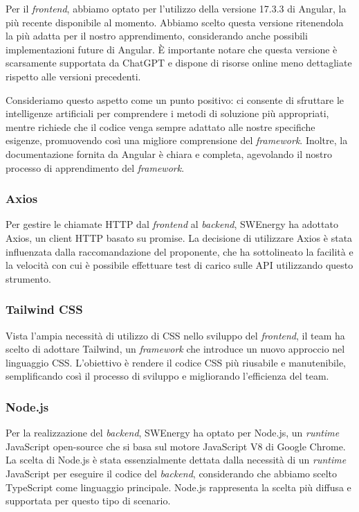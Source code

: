 Per il \textit{frontend}, abbiamo optato per l'utilizzo della versione 17.3.3 di
Angular, la più recente disponibile al momento. Abbiamo scelto questa versione
ritenendola la più adatta per il nostro apprendimento, considerando anche
possibili implementazioni future di Angular. È importante notare che questa
versione è scarsamente supportata da ChatGPT e dispone di risorse online meno
dettagliate rispetto alle versioni precedenti.

Consideriamo questo aspetto come un punto positivo: ci consente di sfruttare le
intelligenze artificiali per comprendere i metodi di soluzione più appropriati,
mentre richiede che il codice venga sempre adattato alle nostre specifiche
esigenze, promuovendo così una migliore comprensione del \textit{framework}.
Inoltre, la documentazione fornita da Angular è chiara e completa, agevolando il
nostro processo di apprendimento del \textit{framework}.

\subsubsection{Axios}

Per gestire le chiamate HTTP dal \textit{frontend} al \textit{backend}, SWEnergy
ha adottato Axios, un client HTTP basato su promise. La decisione di utilizzare
Axios è stata influenzata dalla raccomandazione del proponente, che ha
sottolineato la facilità e la velocità con cui è possibile effettuare test di
carico sulle API utilizzando questo strumento.

\subsubsection{Tailwind CSS}

Vista l'ampia necessità di utilizzo di CSS nello sviluppo del \textit{frontend},
il team ha scelto di adottare Tailwind, un \textit{framework} che introduce un
nuovo approccio nel linguaggio CSS. L'obiettivo è rendere il codice CSS più
riusabile e manutenibile, semplificando così il processo di sviluppo e
migliorando l'efficienza del team.

\subsubsection{Node.js}

Per la realizzazione del \textit{backend}, SWEnergy ha optato per Node.js, un
\textit{runtime} JavaScript open-source che si basa sul motore JavaScript V8 di
Google Chrome. La scelta di Node.js è stata essenzialmente dettata dalla
necessità di un \textit{runtime} JavaScript per eseguire il codice del
\textit{backend}, considerando che abbiamo scelto TypeScript come linguaggio
principale. Node.js rappresenta la scelta più diffusa e supportata per questo
tipo di scenario.

